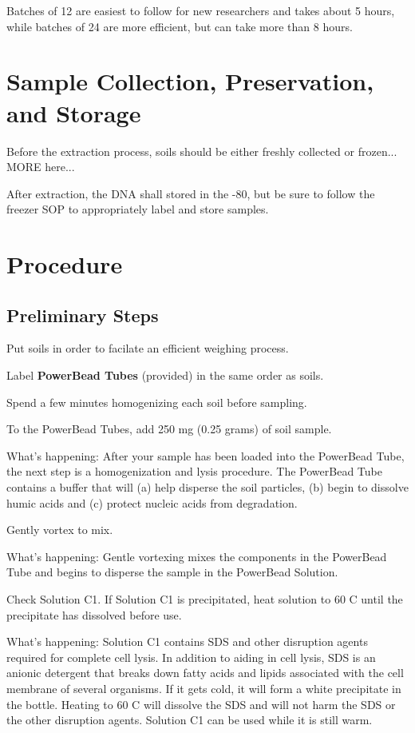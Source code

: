 \documentclass[12pt]{../SOP3_alpha}
\begin{document}
\NP Batches of 12 are easiest to follow for new researchers and takes about 5 hours, while batches of 24 are more efficient, but can take more than 8 hours.

\section{Sample Collection, Preservation, and Storage}

\NP Before the extraction process, soils should be either freshly collected or frozen... MORE here...

\NP After extraction, the DNA shall stored in the -80\degree, but be sure to follow the freezer SOP to appropriately label and store samples.

\section{Procedure}

\subsection*{Preliminary Steps} 
 
\NP Put soils in order to facilate an efficient weighing process. 

\NP Label \textbf{PowerBead Tubes} (provided) in the same order as soils.

\NP Spend a few minutes homogenizing each soil before sampling.

\NP To the PowerBead Tubes, add 250 mg (0.25 grams) of soil sample.

\noindent What's happening: After your sample has been loaded into the PowerBead Tube, the next step is a homogenization and lysis procedure. The PowerBead
Tube contains a buffer that will (a) help disperse the soil particles, (b) begin to dissolve humic acids and (c) protect nucleic acids from degradation.

\NP Gently vortex to mix.

\noindent What's happening: Gentle vortexing mixes the components in the PowerBead Tube and begins to disperse the sample in the PowerBead Solution.

\NP Check Solution C1. If Solution C1 is precipitated, heat solution to 60 \degree C until the precipitate has dissolved before use.

\NP What's happening: Solution C1 contains SDS and other disruption agents required for complete cell lysis. In addition to aiding in cell lysis, SDS is an anionic detergent that breaks down fatty acids and lipids associated with the cell membrane of several organisms. If it gets cold, it will form a white precipitate in the bottle. Heating to 60 \degree C will dissolve the SDS and will not harm the SDS or the other disruption agents. Solution C1 can be used while it is still warm.
\end{document}
